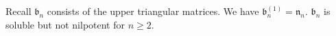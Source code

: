 Recall $\mathfrak{b}_n$ consists of the upper triangular matrices. We have
$\mathfrak{b}_n^{(1)} = \mathfrak{n}_n$. $\mathfrak{b}_n$ is soluble but not
nilpotent for $n\geq 2$.
